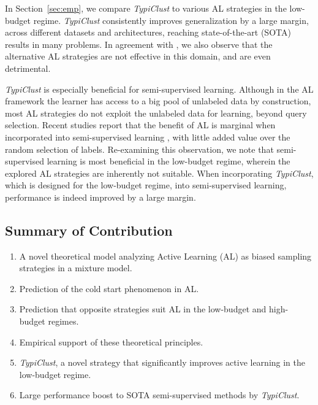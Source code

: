 \documentclass{article}
\begin{document}
In Section~\ref{sec:emp}, we compare \emph{TypiClust} to various AL strategies in the low-budget regime. \emph{TypiClust} consistently improves generalization by a large margin, across different datasets and architectures, reaching state-of-the-art (SOTA) results in many problems. In agreement with \citet{DBLP:journals/tkde/ZhuLHWGLC20}, we also observe that the alternative AL strategies are not effective in this domain, and are even detrimental.


\emph{TypiClust} is especially beneficial for semi-supervised learning. Although in the AL framework the learner has access to a big pool of unlabeled data by construction, most AL strategies do not exploit the unlabeled data for learning, beyond query selection. Recent studies report that the benefit of AL is marginal when incorporated into semi-supervised learning \citep{chan2021marginal,bengar2021reducing}, with little added value over the random selection of labels. Re-examining this observation, we note that semi-supervised learning is most beneficial in the low-budget regime, wherein the explored AL strategies are inherently not suitable. When incorporating \emph{TypiClust}, which is designed for the low-budget regime, into semi-supervised learning, performance is indeed improved by a large margin. 

\vspace{-.2cm}
\subsection*{Summary of Contribution}


\setlength\itemsep{30em}
\begin{enumerate}[leftmargin=0.5cm,label=\roman*.]

\setlength\itemsep{.3em}
    \item A novel theoretical model analyzing Active Learning (AL) as biased sampling strategies in a mixture model.
    \item Prediction of the cold start phenomenon in AL.
    \item Prediction that opposite strategies suit AL in the low-budget and high-budget regimes.
    \item Empirical support of these theoretical principles.
    \item \emph{TypiClust}, a novel strategy that significantly improves active learning in the low-budget regime.
    \item Large performance boost to SOTA semi-supervised methods by \emph{TypiClust}.

\end{enumerate}
\end{document}
